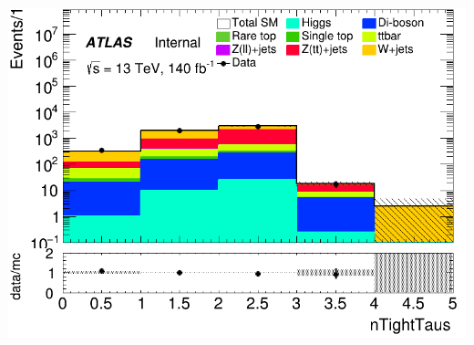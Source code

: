 \documentclass[usenames,dvipsnames]{beamer}
\begin{document}
\begin{frame}
\begin{minipage}{0.32\textwidth}
        \includegraphics[width=\textwidth]{graphics/H_met/H_met_nTightTaus.png}
    \end{minipage}
\end{frame}
\end{document}
